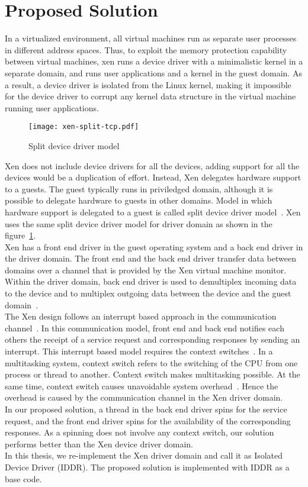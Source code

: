 \section {Proposed Solution} 

In a virtualized environment, all virtual machines run as separate user processes in different address spaces. Thus, to exploit the memory protection capability between virtual machines, xen runs a device driver with a minimalistic kernel in a separate domain, and runs user applications and a kernel in the guest domain. As a result, a device driver is isolated from the Linux kernel, making it impossible for the device driver to corrupt any kernel data structure in the virtual machine running user applications. 
\begin{figure}[!ht]
\centering
\texttt{[image: xen-split-tcp.pdf]}
\caption{Split device driver model}
\label{fig:xen-split}
\end{figure}
Xen does not include device drivers for all the devices, adding support for all the devices would be a duplication of effort. Instead, Xen delegates hardware support to a guests. The guest typically runs in priviledged domain, although it is possible to delegate hardware to guests in other domains. Model in which hardware support is delegated to a guest is called split device driver model~\cite{Chisnall:2007:DGX:1407351}. Xen uses the same split device driver model for driver domain as shown in the figure~\ref{fig:xen-split}.
\\
Xen has a front end driver in the guest operating system and a back end driver in the driver domain. The front end and the back end driver transfer data between domains over a channel that is provided by the Xen virtual machine monitor. Within the driver domain, back end driver is used to demultiplex incoming data to the device and to multiplex outgoing data between the device and the guest domain~\cite{driverdomain}.
\\
The Xen design follows an interrupt based approach in the communication channel~\cite{Barham:2003:XAV:945445.945462}. In this communication model, front end and back end notifies each others the receipt of a service request and corresponding responses by sending an interrupt. This interrupt based model requires the context switches~\cite{Barham:2003:XAV:945445.945462}. In a multitasking system, context switch refers to the switching of the CPU from one process or thread to another. Context switch makes multitasking possible. At the same time, context switch causes unavoidable system overhead~\cite{Li:2007:QCC:1281700.1281702, Mogul:1991:ECS:106973.106982}. Hence the overhead is caused by the communication channel in the Xen driver domain. 
\\
In our proposed solution, a thread in the back end driver spins for the service request, and the front end driver spins for the availability of the corresponding responses. As a spinning does not involve any context switch, our solution performs better than the Xen device driver domain. 
\\
In this thesis, we re-implement the Xen driver domain and call it as Isolated Device Driver (IDDR). The proposed solution is implemented with IDDR as a base code.
\pagebreak

